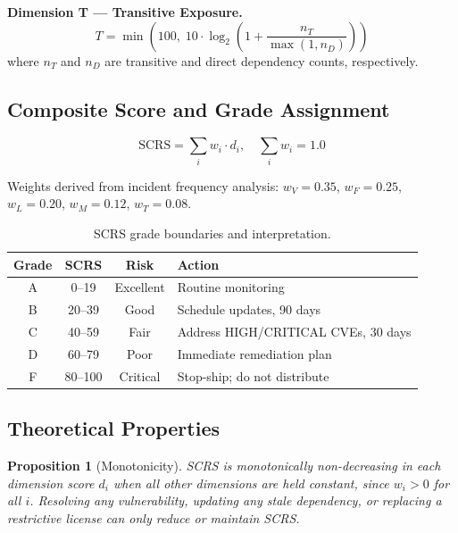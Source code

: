 \documentclass[11pt,twocolumn]{article}
\newtheorem{proposition}{Proposition}
\begin{document}
\noindent\textbf{Dimension T --- Transitive Exposure.}
\begin{equation}
T = \min\!\left(100,\; 10 \cdot \log_2\!\left(1 + \frac{n_T}{\max(1,n_D)}\right)\right)
\end{equation}
where $n_T$ and $n_D$ are transitive and direct dependency counts, respectively.

\subsection{Composite Score and Grade Assignment}

\begin{equation}
\mathrm{SCRS} = \sum_{i} w_i \cdot d_i, \quad \sum_i w_i = 1.0
\end{equation}

Weights derived from incident frequency analysis: $w_V = 0.35$, $w_F = 0.25$,
$w_L = 0.20$, $w_M = 0.12$, $w_T = 0.08$.

\begin{table}[h]
\centering
\small
\caption{SCRS grade boundaries and interpretation.}
\begin{tabular}{cccl}
\toprule
\textbf{Grade} & \textbf{SCRS} & \textbf{Risk} & \textbf{Action} \\
\midrule
A & 0--19  & Excellent & Routine monitoring \\
B & 20--39 & Good      & Schedule updates, 90 days \\
C & 40--59 & Fair      & Address HIGH/CRITICAL CVEs, 30 days \\
D & 60--79 & Poor      & Immediate remediation plan \\
F & 80--100 & Critical & Stop-ship; do not distribute \\
\bottomrule
\end{tabular}
\end{table}

\subsection{Theoretical Properties}

\begin{proposition}[Monotonicity]
SCRS is monotonically non-decreasing in each dimension score $d_i$ when all
other dimensions are held constant, since $w_i > 0$ for all $i$. Resolving any
vulnerability, updating any stale dependency, or replacing a restrictive license
can only reduce or maintain SCRS.
\end{proposition}
\end{document}

